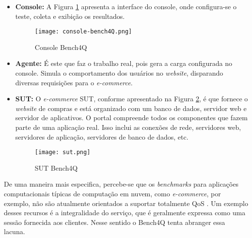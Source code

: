 \begin{itemize}
	
	\item \textbf{Console:} A Figura \ref{fig:console-bench4q} apresenta a interface do console, onde configura-se o teste, coleta e exibição os resultados. 
	
	\begin{figure}[!htb]
		\centering
		\texttt{[image: console-bench4Q.png]}
		\caption{Console Bench4Q}
		\label{fig:console-bench4q}
	\end{figure}
	
	\item \textbf{Agente:} É este que faz o trabalho real, pois gera a carga configurada no console. Simula o comportamento dos usuários no \textit{website}, disparando diversas requisições para o \textit{e-commerce}. 
	
	\item \textbf{SUT:} O \textit{e-commerce} SUT, conforme apresentado na Figura \ref{fig:sut},  é que fornece o \textit{website} de compras e está organizado com um banco de dados, servidor web e servidor de aplicativos. O portal compreende todos os componentes que fazem parte de uma aplicação real. Isso inclui as conexões de rede, servidores web, servidores de aplicação, servidores de banco de dados, etc.
	
	\begin{figure}[htb]
		\centering
		\texttt{[image: sut.png]}
		\caption{SUT Bench4Q}
		\label{fig:sut}
	\end{figure}
	
\end{itemize}

De uma maneira mais especifica, percebe-se que os \textit{benchmarks} para aplicações computacionais típicas de computação em nuvem, como \textit{e-commerce}, por exemplo, não são atualmente orientados a suportar totalmente QoS %
\cite{Zhang2011}. Um exemplo desses recursos é a integralidade do serviço, que é geralmente expressa como uma sessão fornecida aos clientes. Nesse sentido o Bench4Q tenta abranger essa lacuna.


